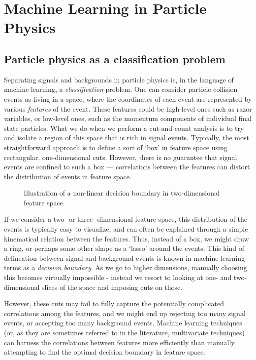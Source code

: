 \chapter{Machine Learning in Particle Physics}
\section{Particle physics as a classification problem}
Separating signals and backgrounds in particle physics is, in the language of machine learning, a \emph{classification} problem. One can consider particle collision events as living in a space, where the coordinates of each event are represented by various \emph{features} of the event. These features could be high-level ones such as razor variables, or low-level ones, such as the momentum components of individual final state particles. What we do when we perform a cut-and-count analysis is to try and isolate a region of this space that is rich in signal events. Typically, the most straightforward approach is to define a sort of `box' in feature space using rectangular, one-dimensional cuts. However, there is no guarantee that signal events are confined to such a box --- correlations between the features can distort the distribution of events in feature space. 
\strictpagecheck
\begin{figure}
  \begin{sidecaption}{Illustration of a non-linear decision boundary in two-dimensional feature space.}
  
\end{sidecaption}
\end{figure}
If we consider a two- or three- dimensional feature space, this distribution of the events is typically easy to visualize, and can often be explained through a simple kinematical relation between the features. Thus, instead of a box, we might draw a ring, or perhaps some other shape as a `lasso' around the events. This kind of delineation between signal and background events is known in machine learning terms as a \emph{decision boundary}. As we go to higher dimensions, manually choosing this becomes virtually impossible - instead we resort to looking at one- and two-dimensional slices of the space and imposing cuts on those. 

However, these cuts may fail to fully capture the potentially complicated correlations among the features, and we might end up rejecting too many signal events, or accepting too many background events. Machine learning techniques (or, as they are sometimes referred to in the literature, multivariate techniques) can harness the correlations between features more efficiently than manually attempting to find the optimal decision boundary in feature space.

